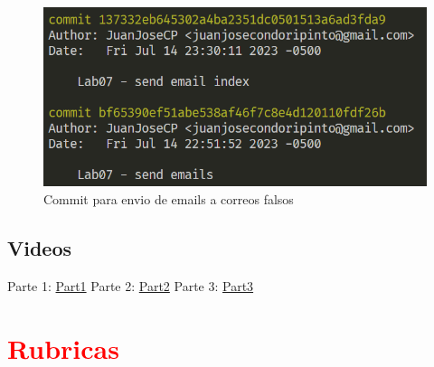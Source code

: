 \documentclass{article}
\begin{document}
        \begin{figure}
            \centering
            \includegraphics[width=150mm]{img/commit4.png}
            \caption{Commit para envio de emails a correos falsos}
            \label{fig:enter-label}
        \end{figure}
    \newpage
    \subsection{Videos}
        Parte 1: \href{https://flip.com/s/y4LkgKW_kXnS}{Part1}
        Parte 2: \href{https://flip.com/s/Zvr3Pnzpbx5_}{Part2}
        Parte 3: \href{https://flip.com/s/TssDry1NFsxz}{Part3}

\newpage
\section{\textcolor{red}{Rubricas}}
\end{document}

